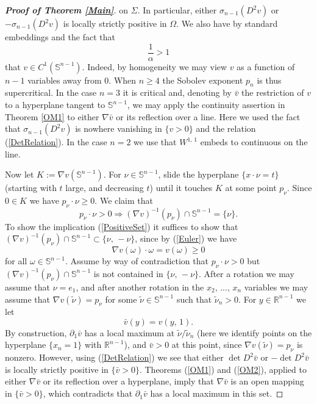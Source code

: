 \documentclass{amsart}
\theoremstyle{definition}
\theoremstyle{remark}
\begin{document}
\begin{proof}[{\bf Proof of Theorem \ref{Main}}]
on $\Sigma$. In particular, either $\sigma_{n-1}(D^2v)$ or $-\sigma_{n-1}(D^2v)$ is locally strictly positive in $\Omega$. We also have by standard embeddings and the fact that 
$$\frac{1}{\alpha} > 1$$ 
that $v \in C^1(\mathbb{S}^{n-1})$. Indeed, by homogeneity we may view $v$ as a function of $n-1$ variables away from $0$. When $n \geq 4$ the Sobolev exponent $p_n$ is thus supercritical. In the case $n = 3$ it is critical and, denoting by $\bar{v}$ the restriction of $v$ to a hyperplane tangent to $\mathbb{S}^{n-1}$, we may apply the continuity assertion in Theorem \ref{OM1} to either $\nabla \bar{v}$ or its reflection over a line. Here we used the fact that $\sigma_{n-1}(D^2v)$ is nowhere vanishing in $\{v > 0\}$ and the relation (\ref{DetRelation}). In the case $n = 2$ we use that $W^{1,\,1}$ embeds to continuous on the line.
 
Now let $K := \nabla v\left(\mathbb{S}^{n-1}\right)$. For $\nu \in \mathbb{S}^{n-1}$, slide the hyperplane $\{x \cdot \nu = t\}$ (starting with $t$ large, and decreasing $t$) until it touches $K$ at some point $p_{\nu}$. Since $0 \in K$ we have $p_{\nu} \cdot \nu \geq 0.$ We claim that
\begin{equation}\label{PositiveSet}
p_{\nu} \cdot \nu > 0 \Rightarrow (\nabla v)^{-1}(p_{\nu}) \cap \mathbb{S}^{n-1} = \{\nu\}.
\end{equation}
To show the implication (\ref{PositiveSet}) it suffices to show that $(\nabla v)^{-1}(p_{\nu}) \cap \mathbb{S}^{n-1} \subset \{\nu,\,-\nu\}$, since by (\ref{Euler}) we have 
$$\nabla v(\omega) \cdot \omega = v(\omega) \geq 0$$ 
for all $\omega \in \mathbb{S}^{n-1}$. 
Assume by way of contradiction that $p_{\nu} \cdot \nu > 0$ but $(\nabla v)^{-1}(p_{\nu}) \cap \mathbb{S}^{n-1}$ is not contained in $\{\nu,\,-\nu\}$. After a rotation we may assume that $\nu = e_1$, and after another rotation in the $x_2,\,...,\,x_n$ variables we may assume that $\nabla v(\tilde{\nu}) = p_{\nu}$ for some $\tilde{\nu} \in \mathbb{S}^{n-1}$ such that $\tilde{\nu}_n > 0$. For $y \in \mathbb{R}^{n-1}$ we let
$$\bar{v}(y) = v(y,\,1).$$
By construction, $\partial_1\bar{v}$ has a local maximum at $\tilde{\nu}/\tilde{\nu}_n$ (here we identify points on the hyperplane $\{x_n = 1\}$ with $\mathbb{R}^{n-1}$), and $\bar{v} > 0$ at this point, since $\nabla v(\tilde{\nu}) = p_{\nu}$ is nonzero. However, using (\ref{DetRelation}) we see that
either $\det D^2\bar{v}$ or $-\det D^2\bar{v}$ is locally strictly positive in $\{\bar{v} > 0\}$. Theorems (\ref{OM1}) and (\ref{OM2}), applied to either $\nabla \bar{v}$ or its reflection over a hyperplane, imply that $\nabla \bar{v}$ is an open mapping in $\{\bar{v} > 0\}$, which contradicts that $\partial_1\bar{v}$ has a local maximum in this set.


\end{proof}
\end{document}
